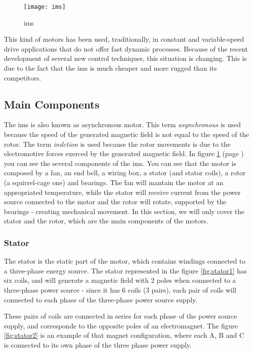 \begin{figure}[htbp]
	\centering
	\texttt{[image: ims]}
	\caption{\acrfull{ims}}
	\label{fig:ims}
\end{figure}

This kind of motors has been used, traditionally, in constant and variable-speed drive applications that do not offer fast dynamic processes. Because of the recent development of several new control techniques, this situation is changing. This is due to the fact that the \acrfull{ims} is much cheaper and more rugged than its competitors.

\subsection{Main Components}

The \acrshort{ims} is also known as asynchronous motor. This term \emph{asynchronous} is used because the speed of the generated magnetic field is not equal to the speed of the rotor. The term \emph{indction} is used because the rotor movements is due to the electromotive forces exerced by the generated magnetic field.
In figure \ref{fig:ims} (page \pageref{fig:ims}) you can see the several components of the \acrshort{ims}. You can see that the motor is composed by a fan, an end bell, a wiring box, a stator (and stator coils), a rotor (a squirrel-cage one) and bearings. The fan will mantain the motor at an appropriated temperature, while the stator will receive current from the power source connected to the motor and the rotor will rotate, supported by the bearings - creating mechanical movement.
In this section, we will only cover the stator and the rotor, which are the main components of the motors. 

\subsubsection{Stator}

The stator is the static part of the motor, which contains windings connected to a three-phase energy source. The stator represented in the figure \ref{fig:stator1} has six coils, and will generate a magnetic field with 2 poles when connected to a three-phase power source - since it has 6 coils (3 pairs), each pair of coils will connected to each phase of the three-phase power source supply.

These pairs of coils are connected in series for each phase of the power source supply, and corresponde to the opposite poles of an electromagnet. The figure \ref{fig:stator2} is an example of that magnet configuration, where each A, B and C is connected to its own phase of the three phase power supply.


